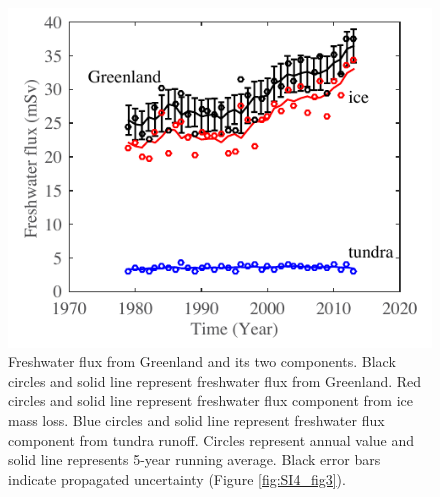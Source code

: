 \begin{figure}
	\centering
	\includegraphics{figs_app/FigS11.pdf}
	\caption[Freshwater flux from Greenland and its two components.]{Freshwater flux from Greenland and its two components.  Black circles and solid line represent freshwater flux from Greenland.  Red circles and solid line represent freshwater flux component from ice mass loss.  Blue circles and solid line represent freshwater flux component from tundra runoff.  Circles represent annual value and solid line represents 5-year running average.  Black error bars indicate propagated uncertainty (Figure \ref{fig:SI4_fig3}).}
	\label{fig:SI4_fig11}
\end{figure}

